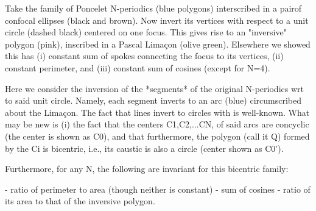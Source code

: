 Take the family of Poncelet N-periodics (blue polygons) interscribed in a pairof confocal ellipses (black and brown). Now invert its vertices with respect to a unit circle (dashed black) centered on one focus. This gives rise to an "inversive" polygon (pink), inscribed in a Pascal Limaçon (olive green). Elsewhere we showed this has (i) constant sum of spokes connecting the focus to its vertices, (ii) constant perimeter, and (iii) constant sum of cosines (except for N=4).

Here we consider the inversion of the *segments* of the original N-periodics wrt to said unit circle. Namely, each segment inverts to an arc (blue) circumscribed about the Limaçon. The fact that lines invert to circles with is well-known. What may be new is (i) the fact that the centers C1,C2,...CN, of said arcs are concyclic (the center is shown as C0), and that furthermore, the polygon (call it Q) formed by the Ci is bicentric, i.e., its caustic is also a circle (center shown as C0').

Furthermore, for any N, the following are invariant for this bicentric family:

- ratio of perimeter to area (though neither is constant)
- sum of cosines
- ratio of its area to that of the inversive polygon.